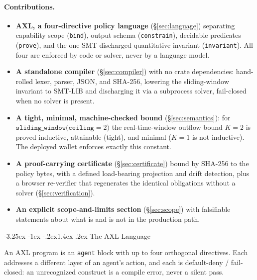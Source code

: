 \documentclass[11pt]{article}
\makeatletter
\renewcommand\section{\@startsection{section}{1}{\z@}%
  {-3.25ex \@plus -1ex \@minus -.2ex}{1.4ex \@plus.2ex}%
  {\normalfont\sffamily\Large\bfseries}}
\theoremstyle{plain}
\theoremstyle{definition}
\theoremstyle{remark}
\makeatother
\begin{document}
\paragraph{Contributions.}
\begin{itemize}
\item \textbf{AXL, a four-directive policy language} (\S\ref{sec:language})
  separating capability scope (\texttt{bind}), output schema
  (\texttt{constrain}), decidable predicates (\texttt{prove}), and the one
  SMT-discharged quantitative invariant (\texttt{invariant}). All four are
  enforced by code or solver, never by a language model.
\item \textbf{A standalone compiler} (\S\ref{sec:compiler}) with no crate
  dependencies: hand-rolled lexer, parser, JSON, and SHA-256, lowering the
  sliding-window invariant to SMT-LIB and discharging it via a subprocess
  solver, fail-closed when no solver is present.
\item \textbf{A tight, minimal, machine-checked bound} (\S\ref{sec:semantics}):
  for $\texttt{sliding\_window(ceiling}=2)$ the real-time-window outflow bound
  $K=2$ is proved inductive, attainable (tight), and minimal ($K=1$ is not
  inductive). The deployed wallet enforces exactly this constant.
\item \textbf{A proof-carrying certificate} (\S\ref{sec:certificate}) bound by
  SHA-256 to the policy bytes, with a defined load-bearing projection and
  drift detection, plus a browser re-verifier that regenerates the identical
  obligations without a solver (\S\ref{sec:verification}).
\item \textbf{An explicit scope-and-limits section} (\S\ref{sec:scope}) with
  falsifiable statements about what is and is not in the production path.
\end{itemize}

\section{The AXL Language}\label{sec:language}

An AXL program is an \texttt{agent} block with up to four orthogonal
directives. Each addresses a different layer of an agent's action, and each is
default-deny / fail-closed: an unrecognized construct is a compile error, never
a silent pass.
\end{document}
